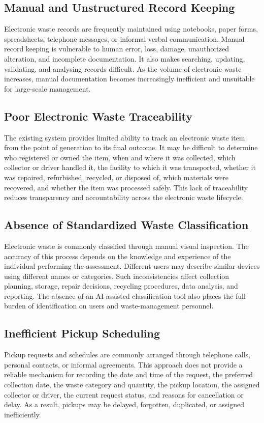 \subsection{Manual and Unstructured Record Keeping}
Electronic waste records are frequently maintained using notebooks, paper forms,
spreadsheets, telephone messages, or informal verbal communication. Manual
record keeping is vulnerable to human error, loss, damage, unauthorized
alteration, and incomplete documentation. It also makes searching, updating,
validating, and analysing records difficult. As the volume of electronic waste
increases, manual documentation becomes increasingly inefficient and unsuitable
for large-scale management.

\subsection{Poor Electronic Waste Traceability}
The existing system provides limited ability to track an electronic waste item
from the point of generation to its final outcome. It may be difficult to determine
who registered or owned the item, when and where it was collected, which
collector or driver handled it, the facility to which it was transported, whether it
was repaired, refurbished, recycled, or disposed of, which materials were
recovered, and whether the item was processed safely. This lack of traceability
reduces transparency and accountability across the electronic waste lifecycle.

\subsection{Absence of Standardized Waste Classification}
Electronic waste is commonly classified through manual visual inspection. The
accuracy of this process depends on the knowledge and experience of the
individual performing the assessment. Different users may describe similar
devices using different names or categories. Such inconsistencies affect collection
planning, storage, repair decisions, recycling procedures, data analysis, and
reporting. The absence of an AI-assisted classification tool also places the full
burden of identification on users and waste-management personnel.

\subsection{Inefficient Pickup Scheduling}
Pickup requests and schedules are commonly arranged through telephone calls,
personal contacts, or informal agreements. This approach does not provide a
reliable mechanism for recording the date and time of the request, the preferred
collection date, the waste category and quantity, the pickup location, the assigned
collector or driver, the current request status, and reasons for cancellation or
delay. As a result, pickups may be delayed, forgotten, duplicated, or assigned
inefficiently.


